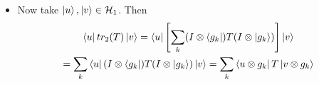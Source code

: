 \documentclass[a4paper, 11pt]{article}
\begin{document}
{\begin{itemize}
\begin{align*}
			tr_2(T) & = tr_2\lt( \sum\limits_{i,j}\gm_{i,j}A_i\tensor B_j \rt)=\sum\limits_{i,j}\gm_{i,j}tr_2(A_i\tensor B_j)\\
			& = \sum\limits_{i,j}\gm_{i,j}A_i tr( B_j)\\
			& = \sum_{i,j}A_i\sum_k\bra{g_k}B_j\ket{g_k}\\
			& = \sum_{i,j}\sum_k\gm_{i,j}(I\tensor \bra{g_k})A_i\tensor B_j(I\tensor \ket{g_K})\\
			& = \sum_k(I\tensor \bra{g_k})\lt[ \sum_{i,j}\gm_{i,j}A_i\tensor B_j\rt](I\tensor \ket{g_K})\\
			& = \sum_k(I\tensor \bra{g_k})T(I\tensor \ket{g_k})
		\end{align*}So if we get two different representations of $T$, $T=\sum\limits_{i,j}\gm_{i,j}A_i\tensor B_j$ and $T=\sum\limits_{i,j}\gm'_{i,j}A_i'\tensor B_j'$ still for each of them $tr_2(T)$ will be same since it doesn't matter which representation is finally taken. Therefore $tr_2(T)$ is well defined.
		\item  Now take $\ket{u},\ket{v}\in \mathcal{H}_1$. Then \begin{multline*}
			\bra{u}tr_2(T)\ket{v}=\bra{u}\left[\sum_k(I\otimes \bra{g_k})T(I\otimes \ket{g_k}) \right]\ket{v}\\
			= \sum_k\bra{u}(I\otimes \bra{g_k})T(I\otimes \ket{ g_k})\ket{v}=\sum_k\bra{u\otimes g_k}T \ket{v\otimes g_k}
		\end{multline*}
	\end{itemize}
}

\end{document}
